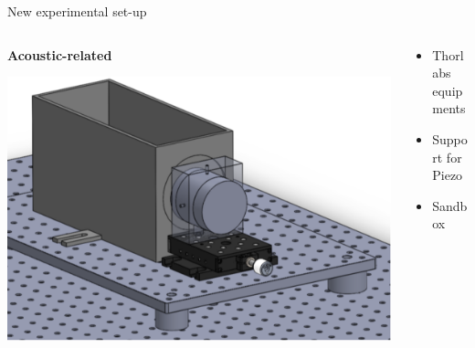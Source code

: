 \documentclass[utf8]{beamer} \usetheme{lfcr} %
\begin{document}
\begin{frame}{New experimental set-up}
  \begin{columns}
    \begin{column}{0.5\textwidth}
      \textbf{Acoustic-related}

      \includegraphics[width=\textwidth]{newsetup.pdf}
    \end{column}
    \begin{column}{0.5\textwidth}
      \begin{itemize}
        \item Thorlabs equipments
        \item Support for Piezo
        \item Sandbox
      \end{itemize}

    \end{column}
  \end{columns}
\end{frame}
%
\end{document}
